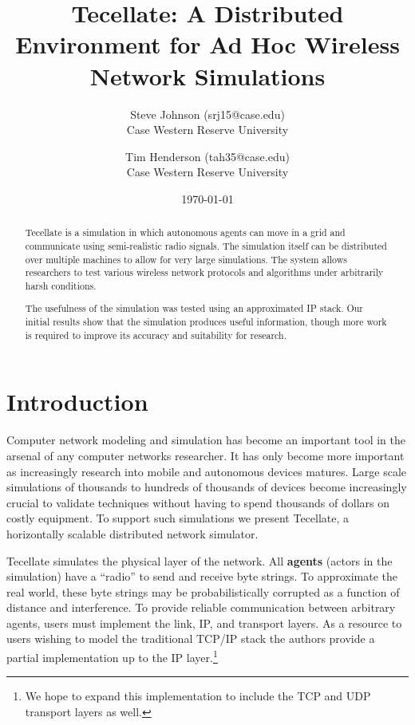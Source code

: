 \documentclass[12pt]{article}
\title{Tecellate: A Distributed Environment for Ad Hoc Wireless Network Simulations}
\author{
        Steve Johnson (srj15@case.edu)\\
        Case Western Reserve University\\
        \and Tim Henderson (tah35@case.edu)\\
        Case Western Reserve University
}
\date{\today}
\begin{document}
\doublespacing
\maketitle


\begin{abstract}
    Tecellate is a simulation in which autonomous agents can move in a grid and communicate using
    semi-realistic radio signals. The simulation itself can be distributed over multiple machines to
    allow for very large simulations. The system allows researchers to test various wireless network
    protocols and algorithms under arbitrarily harsh conditions.
    
    The usefulness of the simulation was tested using an approximated IP stack. Our initial results
    show that the simulation produces useful information, though more work is required to improve
    its accuracy and suitability for research.
\end{abstract}

\section{Introduction}

Computer network modeling and simulation has become an important tool in the arsenal of any computer
networks researcher. It has only become more important as increasingly research into mobile
and autonomous devices matures. Large scale simulations of thousands to hundreds of thousands of
devices become increasingly crucial to validate techniques without having to spend thousands of
dollars on costly equipment. To support such simulations we present Tecellate, a horizontally
scalable distributed network simulator.

Tecellate simulates the physical layer of the network. All \textbf{agents} (actors in the
simulation) have a ``radio'' to send and receive byte strings. To approximate the real world, these
byte strings may be probabilistically corrupted as a function of distance and interference. To
provide reliable communication between arbitrary agents, users must implement the link, IP, and
transport layers. As a resource to users wishing to model the traditional TCP/IP stack the authors
provide a partial implementation up to the IP layer.\footnote{
  We hope to expand this implementation to include the TCP and UDP transport layers as well.
}
\end{document}
